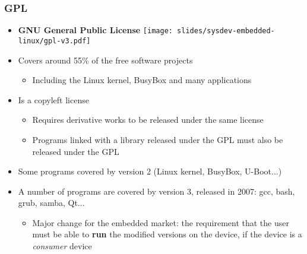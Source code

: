 \begin{frame}
  \frametitle{GPL}
  \begin{itemize}
  \item {\bf GNU General Public License}
    \hfill \texttt{[image: slides/sysdev-embedded-linux/gpl-v3.pdf]}
  \item Covers around 55\% of the free software projects
    \begin{itemize}
    \item Including the Linux kernel, BusyBox and many applications
    \end{itemize}
  \item Is a copyleft license
    \begin{itemize}
    \item Requires derivative works to be released under the same
      license
    \item Programs linked with a library released under the GPL must
      also be released under the GPL
    \end{itemize}
  \item Some programs covered by version 2 (Linux kernel, BusyBox, U-Boot...)
  \item A number of programs are covered by version 3, released in 2007:
	gcc, bash, grub, samba, Qt...
    \begin{itemize}
    \item Major change for the embedded market: the requirement that
      the user must be able to {\bf run} the modified versions on the
      device, if the device is a {\em consumer} device
    \end{itemize}
  \end{itemize}
\end{frame}

